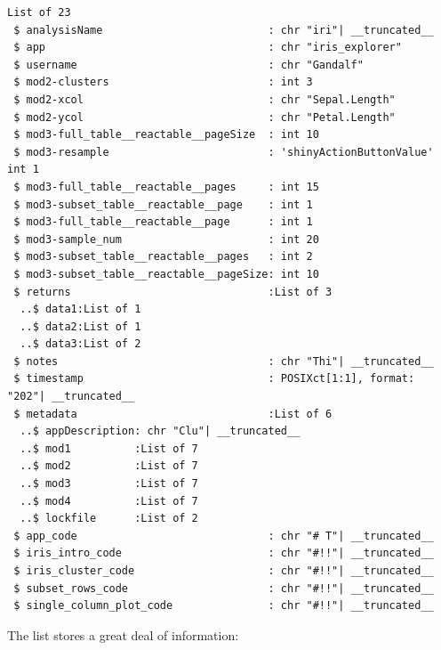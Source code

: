 \begin{verbatim}
List of 23
 $ analysisName                          : chr "iri"| __truncated__
 $ app                                   : chr "iris_explorer"
 $ username                              : chr "Gandalf"
 $ mod2-clusters                         : int 3
 $ mod2-xcol                             : chr "Sepal.Length"
 $ mod2-ycol                             : chr "Petal.Length"
 $ mod3-full_table__reactable__pageSize  : int 10
 $ mod3-resample                         : 'shinyActionButtonValue' int 1
 $ mod3-full_table__reactable__pages     : int 15
 $ mod3-subset_table__reactable__page    : int 1
 $ mod3-full_table__reactable__page      : int 1
 $ mod3-sample_num                       : int 20
 $ mod3-subset_table__reactable__pages   : int 2
 $ mod3-subset_table__reactable__pageSize: int 10
 $ returns                               :List of 3
  ..$ data1:List of 1
  ..$ data2:List of 1
  ..$ data3:List of 2
 $ notes                                 : chr "Thi"| __truncated__
 $ timestamp                             : POSIXct[1:1], format: "202"| __truncated__
 $ metadata                              :List of 6
  ..$ appDescription: chr "Clu"| __truncated__
  ..$ mod1          :List of 7
  ..$ mod2          :List of 7
  ..$ mod3          :List of 7
  ..$ mod4          :List of 7
  ..$ lockfile      :List of 2
 $ app_code                              : chr "# T"| __truncated__
 $ iris_intro_code                       : chr "#!!"| __truncated__
 $ iris_cluster_code                     : chr "#!!"| __truncated__
 $ subset_rows_code                      : chr "#!!"| __truncated__
 $ single_column_plot_code               : chr "#!!"| __truncated__
\end{verbatim}

The list stores a great deal of information:

